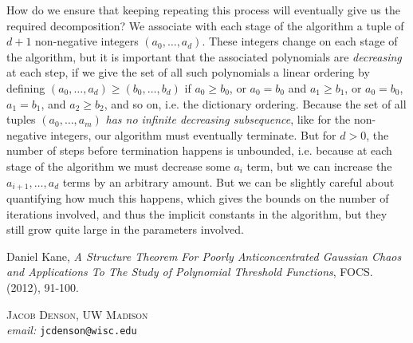 \documentclass{article}
\theoremstyle{plain}
\theoremstyle{definition}
\begin{document}
How do we ensure that keeping repeating this process will eventually give us the required decomposition? We associate with each stage of the algorithm a tuple of $d+1$ non-negative integers $(a_0,\dots,a_d)$. These integers change on each stage of the algorithm, but it is important that the associated polynomials are \emph{decreasing} at each step, if we give the set of all such polynomials a linear ordering by defining $(a_0,\dots,a_d) \geq (b_0,\dots,b_d)$ if $a_0 \geq b_0$, or $a_0 = b_0$ and $a_1 \geq b_1$, or $a_0 = b_0$, $a_1 = b_1$, and $a_2 \geq b_2$, and so on, i.e. the dictionary ordering. Because the set of all tuples $(a_0,\dots,a_m)$ \emph{has no infinite decreasing subsequence}, like for the non-negative integers, our algorithm must eventually terminate. But for $d > 0$, the number of steps before termination happens is unbounded, i.e. because at each stage of the algorithm we must decrease some $a_i$ term, but we can increase the $a_{i+1}, \dots, a_d$ terms by an arbitrary amount. But we can be slightly careful about quantifying how much this happens, which gives the bounds on the number of iterations involved, and thus the implicit constants in the algorithm, but they still grow quite large in the parameters involved.

\begin{thebibliography}{3}

    Daniel Kane,
    \emph{A Structure Theorem For Poorly Anticoncentrated Gaussian Chaos and Applications To The Study of Polynomial Threshold Functions},
    FOCS. (2012), 91-100.

\end{thebibliography}

\noindent \textsc{Jacob Denson, UW Madison}\\
\textit{email:} \texttt{jcdenson@wisc.edu}
\end{document}
